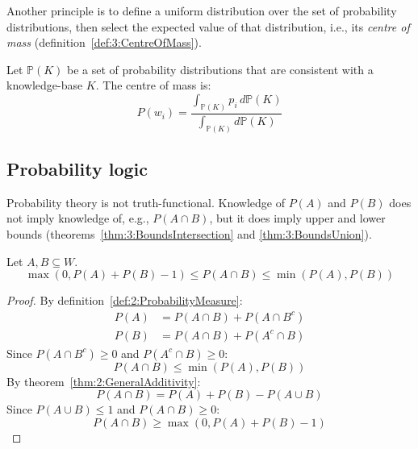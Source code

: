 Another principle is to define a uniform distribution over the set of
probability distributions, then select the expected value of that distribution,
i.e., its \textit{centre of mass} (definition~\ref{def:3:CentreOfMass}).

\begin{dfn}
  \label{def:3:CentreOfMass}
  Let $\mathbb{P}(K)$ be a set of probability distributions that are consistent
  with a knowledge-base $K$. The centre of mass is:
  \begin{equation}
    P(w_i) = \frac{\int_{\mathbb{P}(K)} p_i \, d \mathbb{P}(K) }{\int_{\mathbb{P}(K)} d \mathbb{P}(K)}
  \end{equation}
\end{dfn}

\subsection{Probability logic}

Probability theory is not truth-functional.
Knowledge of $P(A)$ and $P(B)$ does not imply knowledge of, e.g., $P(A \cap B)$,
but it does imply upper and lower bounds
(theorems~\ref{thm:3:BoundsIntersection} and \ref{thm:3:BoundsUnion}).

\begin{thm}
  \label{thm:3:BoundsIntersection}
  Let $A, B \subseteq W$.
  \begin{equation}
    \label{eqn:3:BoundsIntersection}
    \max(0, P(A) + P(B) - 1) \leq P(A \cap B) \leq \min(P(A), P(B))
  \end{equation}
  \begin{proof}
    By definition~\ref{def:2:ProbabilityMeasure}:
    \begin{align}
      P(A) & = P(A \cap B) + P(A \cap B^c) \label{eqn:3:BoundsIntersection1} \\
      P(B) & = P(A \cap B) + P(A^c \cap B) \label{eqn:3:BoundsIntersection2}
    \end{align}
    Since $P(A \cap B^c) \geq 0$ and $P(A^c \cap B) \geq 0$:
    \begin{equation}
      P(A \cap B) \leq \min(P(A), P(B)) \label{eqn:3:BoundsIntersection3}
    \end{equation}
    By theorem~\ref{thm:2:GeneralAdditivity}:
    \begin{equation}
      P(A \cap B) = P(A) + P(B) - P(A \cup B) \label{eqn:3:BoundsIntersection4}
    \end{equation}
    Since $P(A \cup B) \leq 1$ and $P(A \cap B) \geq 0$:
    \begin{equation}
      P(A \cap B) \geq \max(0, P(A) + P(B) - 1) \label{eqn:3:BoundsIntersection5}
    \end{equation}
  \end{proof}
\end{thm}

